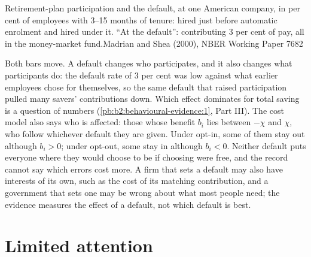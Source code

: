 \begin{omchart}{Retirement-plan participation and the default, at one American company, in per cent of
  employees with 3--15 months of tenure: hired just before automatic enrolment and hired under it.
  ``At the default'': contributing 3 per cent of pay, all in the money-market fund.}{Madrian and Shea
  (2000), NBER Working Paper 7682}
\end{omchart}

Both bars move. A default changes who participates, and it also changes what participants do: the
default rate of 3 per cent was low against what earlier employees chose for themselves, so the same
default that raised participation pulled many savers' contributions down. Which effect dominates for
total saving is a question of numbers (\cref{pb:b2:behavioural-evidence:1}, Part III). The cost model
also says who is affected: those whose benefit $b_i$ lies between $-\chi$ and $\chi$, who follow
whichever default they are given. Under opt-in, some of them stay out although $b_i > 0$; under
opt-out, some stay in although $b_i < 0$. Neither default puts everyone where they would choose to be
if choosing were free, and the record cannot say which errors cost more. A firm that sets a default may
also have interests of its own, such as the cost of its matching contribution, and a government that
sets one may be wrong about what most people need; the evidence measures the effect of a default, not
which default is best.

\section{Limited attention}\label{sec:b2:behavioural-evidence:attention}

